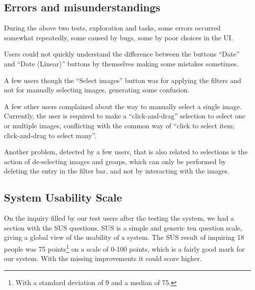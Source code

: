 \subsection{Errors and misunderstandings} %

During the above two tests, exploration and tasks, some errors occurred somewhat repeatedly, some caused by bugs, some by poor choices in the \ac{UI}.

Users could not quickly understand the difference between the buttons ``Date'' and ``Date (Linear)'' buttons by themselves making some mistakes sometimes.

A few users though the ``Select images'' button was for applying the filters and not for manually selecting images, generating some confusion.

A few other users complained about the way to manually select a single image. Currently, the user is required to make a ``click-and-drag'' selection to select one or multiple images, conflicting with the common way of ``click to select item; click-and-drag to select many''.

Another problem, detected by a few users, that is also related to selections is the action of de-selecting images and groups, which can only be performed by deleting the entry in the filter bar, and not by interacting with the images.  





\subsection{System Usability Scale}

On the inquiry filled by our test users after the testing the system, we had a section with the \acf{SUS} questions. \ac{SUS}\cite{Brooke:1996ua} is a simple and generic ten question scale, giving a global view of the usability of a system. The \ac{SUS} result of inquiring 18 people was 75 points\footnote{With a standard deviation of 9 and a median of 75.} on a scale of 0-100 points, which is a fairly good mark for our system. With the missing improvements it could score higher.

